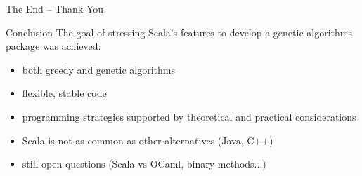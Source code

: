 \documentclass{beamer}
\begin{document}
\begin{frame}{The End -- Thank You}
  \begin{block}{Conclusion}
    The goal of stressing Scala's features to develop a genetic algorithms
    package was achieved:
    \begin{itemize}
      \item[\Checkmark] both greedy and genetic algorithms
      \item[\Checkmark] flexible, stable code
      \item[\Checkmark] programming strategies supported by
                        theoretical and practical considerations
      \item[\XSolidBrush] Scala is not as common as other alternatives (Java, C++)
      \item[\XSolidBrush] still open questions (Scala vs OCaml, binary methods...)
    \end{itemize}
  \end{block}
\end{frame}
\end{document}
